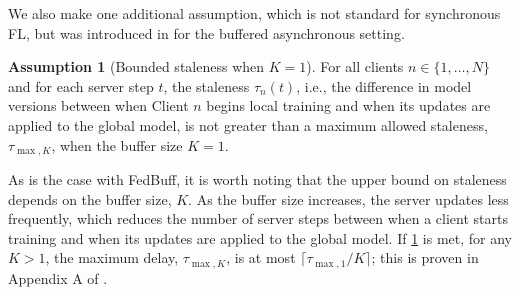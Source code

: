 \documentclass[nohyperref]{article}
\theoremstyle{plain}
\theoremstyle{definition}
\newtheorem{assumption}[theorem]{Assumption}
\theoremstyle{remark}
\begin{document}
We also make one additional assumption, which is not standard for synchronous FL, but was introduced in \cite{FedBuff} for the buffered asynchronous setting.
\begin{assumption}[Bounded staleness when $K=1$]
    \label{ass:bounded-staleness}
    For all clients $n\in \{1, \ldots, N\}$ and for each server step $t$, the staleness $\tau_n(t)$, i.e., the difference in model versions between when Client $n$ begins local training and when its updates are applied to the global model, is not greater than a maximum allowed staleness, $\tau_{\max, K}$, when the buffer size $K = 1$.
\end{assumption}
As is the case with FedBuff, it is worth noting that the upper bound on staleness depends on the buffer size, $K$.
As the buffer size increases, the server updates less frequently, which reduces the number of server steps between when a client starts training and when its updates are applied to the global model.
If \cref{ass:bounded-staleness} is met, for any $K>1$, the maximum delay, $\tau_{\max,K}$, is at most $\lceil \tau_{\max,1}/K \rceil$; this is proven in Appendix A of \cite{FedBuff}.
\end{document}
